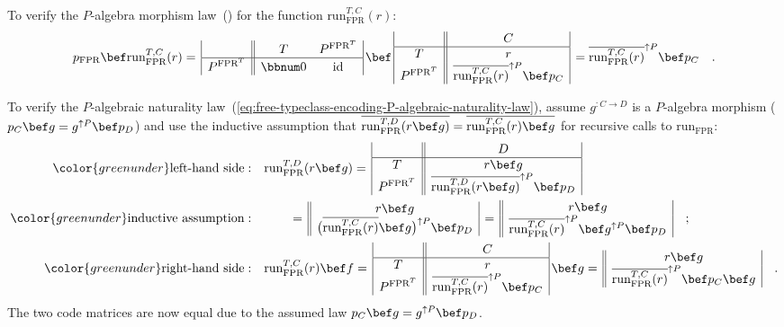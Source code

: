 To verify the $P$-algebra morphism law~() for the function $\text{run}_{\text{FPR}}^{T,C}(r)$:
\[
p_{\text{FPR}}\bef\text{run}_{\text{FPR}}^{T,C}(r)=\,\begin{array}{|c||cc|}
 & T & P^{\text{FPR}^{T}}\\
\hline P^{\text{FPR}^{T}} & \bbnum 0 & \text{id}
\end{array}\,\bef\,\begin{array}{|c||c|}
 & C\\
\hline T & r\\
P^{\text{FPR}^{T}} & \overline{\text{run}_{\text{FPR}}^{T,C}(r)}^{\uparrow P}\bef p_{C}
\end{array}\,=\overline{\text{run}_{\text{FPR}}^{T,C}(r)}^{\uparrow P}\bef p_{C}\quad.
\]

To verify the $P$-algebraic naturality law~(\ref{eq:free-typeclass-encoding-P-algebraic-naturality-law}),
assume $g^{:C\rightarrow D}$ is a $P$-algebra morphism ($p_{C}\bef g=g^{\uparrow P}\bef p_{D}$)
and use the inductive assumption that $\overline{\text{run}_{\text{FPR}}^{T,D}(r\bef g)}=\overline{\text{run}_{\text{FPR}}^{T,C}(r)\bef g}$
for recursive calls to $\text{run}_{\text{FPR}}$:
\begin{align*}
{\color{greenunder}\text{left-hand side}:}\quad & \text{run}_{\text{FPR}}^{T,D}(r\bef g)=\,\begin{array}{|c||c|}
 & D\\
\hline T & r\bef g\\
P^{\text{FPR}^{T}} & \overline{\text{run}_{\text{FPR}}^{T,D}(r\bef g)}^{\uparrow P}\bef p_{D}
\end{array}\\
{\color{greenunder}\text{inductive assumption}:}\quad & \quad\quad=\,\begin{array}{||c|}
r\bef g\\
\big(\overline{\text{run}_{\text{FPR}}^{T,C}(r)}\bef g\big)^{\uparrow P}\bef p_{D}
\end{array}\,=\,\begin{array}{||c|}
r\bef g\\
\overline{\text{run}_{\text{FPR}}^{T,C}(r)}^{\uparrow P}\bef g^{\uparrow P}\bef p_{D}
\end{array}\quad;\\
{\color{greenunder}\text{right-hand side}:}\quad & \text{run}_{\text{FPR}}^{T,C}(r)\bef f=\,\begin{array}{|c||c|}
 & C\\
\hline T & r\\
P^{\text{FPR}^{T}} & \overline{\text{run}_{\text{FPR}}^{T,C}(r)}^{\uparrow P}\bef p_{C}
\end{array}\,\bef g=\,\begin{array}{||c|}
r\bef g\\
\overline{\text{run}_{\text{FPR}}^{T,C}(r)}^{\uparrow P}\bef p_{C}\bef g
\end{array}\quad.
\end{align*}
The two code matrices are now equal due to the assumed law $p_{C}\bef g=g^{\uparrow P}\bef p_{D}$.

